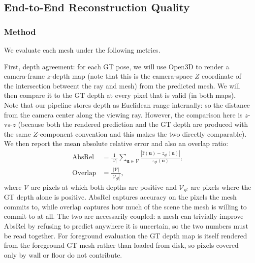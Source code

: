 \documentclass[10pt,twocolumn]{article}
\begin{document}
\subsection{End-to-End Reconstruction Quality}

\subsubsection{Method}

We evaluate each mesh under the following metrics.

First, depth agreement: for each GT pose, we will use Open3D to render a camera-frame $z$-depth map (note that this is the camera-space $Z$ coordinate of the intersection betweent the ray and mesh) from the predicted mesh. We will then compare it to the GT depth at every pixel that is valid (in both maps).
Note that our pipeline stores depth as Euclidean range internally: so the distance from the camera center along the viewing ray. However, the comparison here is $z$-vs-$z$ (because both the rendered prediction and the GT depth are produced with the same $Z$-component convention and this makes the two directly comparable).
We then report the mean absolute relative error \cite{eigen2014} and also an overlap ratio:
\begin{align}
    \text{AbsRel} &= \frac{1}{|\mathcal{V}|}\sum_{\mathbf{u}\in\mathcal{V}} \frac{|\hat{z}(\mathbf{u}) - z_{gt}(\mathbf{u})|}{z_{gt}(\mathbf{u})}, \\
    \text{Overlap} &= \frac{|\mathcal{V}|}{|\mathcal{V}_{gt}|},
\end{align}
where $\mathcal{V}$ are pixels at which both depths are positive and $\mathcal{V}_{gt}$ are pixels where the GT depth alone is positive. AbsRel captures accuracy on the pixels the mesh commits to, while overlap captures how much of the scene the mesh is willing to commit to at all. The two are necessarily coupled: a mesh can trivially improve AbsRel by refusing to predict anywhere it is uncertain, so the two numbers must be read together. For foreground evaluation the GT depth map is itself rendered from the foreground GT mesh rather than loaded from disk, so pixels covered only by wall or floor do not contribute.
\end{document}
